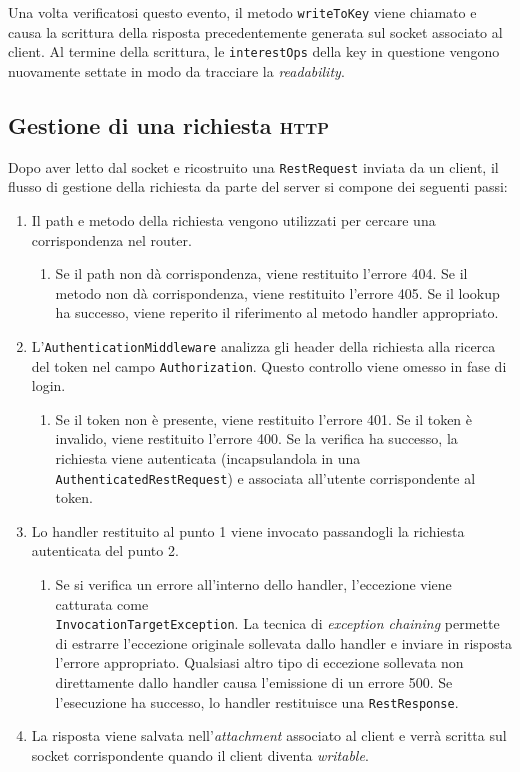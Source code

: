 \documentclass[a4paper,8pt]{article} %
\def\code#1{\texttt{#1}}
\begin{document}
\par Una volta verificatosi questo evento, il metodo \code{writeToKey} viene chiamato e causa la scrittura della risposta precedentemente generata sul socket associato al client. Al termine della scrittura, le \code{interestOps} della key in questione
vengono nuovamente settate in modo da tracciare la \emph{readability}.

\subsection{Gestione di una richiesta \textsc{http}}
\label{sec:http_flow}

Dopo aver letto dal socket e ricostruito una \code{RestRequest} inviata da un client, il flusso di gestione della richiesta da parte del server si compone dei seguenti passi:
\begin{enumerate}
    \item Il path e metodo della richiesta vengono utilizzati per cercare una corrispondenza nel router.
          \begin{enumerate}
              \item Se il path non dà corrispondenza, viene restituito l'errore 404. Se il metodo non dà corrispondenza, viene restituito l'errore 405. Se il lookup ha successo, viene reperito il riferimento al metodo handler appropriato.
          \end{enumerate}
    \item L'\code{AuthenticationMiddleware} analizza gli header della richiesta alla ricerca del token nel campo \code{Authorization}. Questo controllo viene omesso in fase di login.
          \begin{enumerate}
              \item Se il token non è presente, viene restituito l'errore 401. Se il token è invalido, viene restituito l'errore 400. Se la verifica ha successo, la richiesta viene autenticata (incapsulandola in una \code{AuthenticatedRestRequest}) e associata all'utente corrispondente al token.
          \end{enumerate}
    \item Lo handler restituito al punto 1 viene invocato passandogli la richiesta autenticata del punto 2.
          \begin{enumerate}
              \item Se si verifica un errore all'interno dello handler, l'eccezione viene catturata come\\ \code{InvocationTargetException}. La tecnica di \emph{exception chaining} permette di estrarre l'eccezione originale
                    sollevata dallo handler e inviare in risposta l'errore appropriato. Qualsiasi altro tipo di eccezione sollevata non direttamente dallo handler causa l'emissione di un errore 500. Se l'esecuzione ha successo, lo handler restituisce una \code{RestResponse}.
          \end{enumerate}
    \item La risposta viene salvata nell'\emph{attachment} associato al client e verrà scritta sul socket corrispondente quando il client diventa \emph{writable}.
\end{enumerate}
\end{document}
